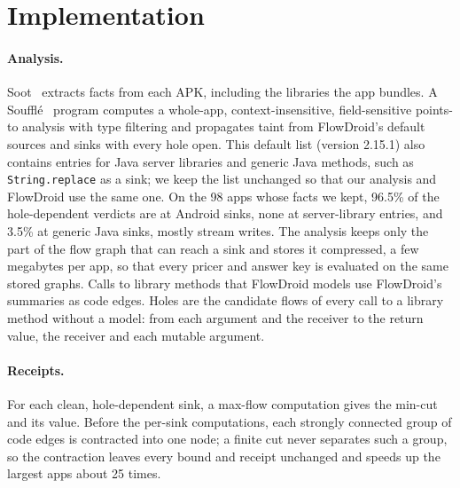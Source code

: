 \section{Implementation}
\label{sec:impl}

\paragraph{Analysis.}
Soot~\cite{soot} extracts facts from each APK, including the libraries the app bundles.
A Souffl\'e~\cite{souffle} program computes a whole-app, context-insensitive, field-sensitive points-to analysis with type filtering and propagates taint from FlowDroid's default sources and sinks with every hole open.
This default list (version 2.15.1) also contains entries for Java server libraries and generic Java methods, such as \texttt{String.replace} as a sink; we keep the list unchanged so that our analysis and FlowDroid use the same one.
On the 98 apps whose facts we kept, 96.5\% of the hole-dependent verdicts are at Android sinks, none at server-library entries, and 3.5\% at generic Java sinks, mostly stream writes.
The analysis keeps only the part of the flow graph that can reach a sink and stores it compressed, a few megabytes per app, so that every pricer and answer key is evaluated on the same stored graphs.
Calls to library methods that FlowDroid models use FlowDroid's summaries as code edges.
Holes are the candidate flows of every call to a library method without a model: from each argument and the receiver to the return value, the receiver and each mutable argument.

\paragraph{Receipts.}
For each clean, hole-dependent sink, a max-flow computation gives the min-cut and its value.
Before the per-sink computations, each strongly connected group of code edges is contracted into one node; a finite cut never separates such a group, so the contraction leaves every bound and receipt unchanged and speeds up the largest apps about 25 times.


